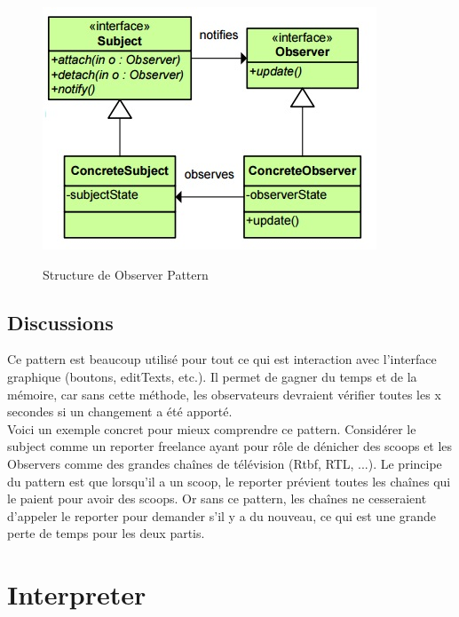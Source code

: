 \begin{figure}[!ht]
	\centering
	\begin{minipage}[t]{8.0cm}
		\includegraphics[scale=0.7]{Images/obs.jpg}
		\label{s1}
   		\caption{Structure de Observer Pattern}
	\end{minipage}
	
\end{figure}


\subsection{Discussions}
Ce pattern est beaucoup utilisé pour tout ce qui est interaction avec l'interface graphique (boutons, editTexts, etc.). Il permet de gagner du temps et de la mémoire, car sans cette méthode, les observateurs devraient vérifier toutes les x secondes si un changement a été apporté. \\
Voici un exemple concret pour mieux comprendre ce pattern. Considérer le subject comme un reporter freelance ayant pour rôle de dénicher des scoops et les Observers comme des grandes chaînes de télévision (Rtbf, RTL, ...). Le principe du pattern est que lorsqu'il a un scoop, le reporter prévient toutes les chaînes qui le paient pour avoir des scoops. Or sans ce pattern, les chaînes ne cesseraient d'appeler le reporter pour demander s'il y a du nouveau, ce qui est une grande perte de temps pour les deux partis.












\section{Interpreter}
